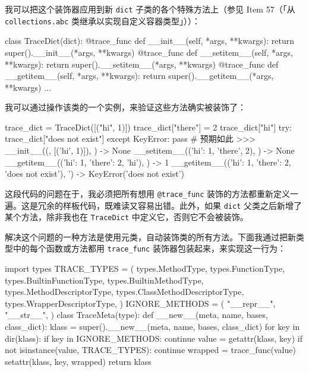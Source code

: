 我可以把这个装饰器应用到新 \texttt{dict} 子类的各个特殊方法上（参见 Item 57（「从 \texttt{collections.abc} 类继承以实现自定义容器类型」））：

\begin{codebox}[python]
class TraceDict(dict):
    @trace_func
    def __init__(self, *args, **kwargs):
        return super().__init__(*args, **kwargs)
    @trace_func
    def __setitem__(self, *args, **kwargs):
        return super().__setitem__(*args, **kwargs)
    @trace_func
    def __getitem__(self, *args, **kwargs):
        return super().__getitem__(*args, **kwargs)
    ...
\end{codebox}

我可以通过操作该类的一个实例，来验证这些方法确实被装饰了：

\begin{codebox}[python]
trace_dict = TraceDict([("hi", 1)])
trace_dict["there"] = 2
trace_dict["hi"]
try:
    trace_dict["does not exist"]
except KeyError:
    pass  # 预期如此
>>>
__init__(({}, [('hi', 1)]), {}) -> None
__setitem__(({'hi': 1}, 'there', 2), {}) -> None
__getitem__(({'hi': 1, 'there': 2}, 'hi'), {}) -> 1
__getitem__(({'hi': 1, 'there': 2}, 'does not exist'),
'{}) -> KeyError('does not exist')
\end{codebox}

这段代码的问题在于，我必须把所有想用 \texttt{@trace\_func} 装饰的方法都重新定义一遍。这是冗余的样板代码，既难读又容易出错。此外，如果 \texttt{dict} 父类之后新增了某个方法，除非我也在 \texttt{TraceDict} 中定义它，否则它不会被装饰。

解决这个问题的一种方法是使用元类，自动装饰类的所有方法。下面我通过把新类型中的每个函数或方法都用 \texttt{trace\_func} 装饰器包装起来，来实现这一行为：

\begin{codebox}[python]
import types
TRACE_TYPES = (
    types.MethodType,
    types.FunctionType,
    types.BuiltinFunctionType,
    types.BuiltinMethodType,
    types.MethodDescriptorType,
    types.ClassMethodDescriptorType,
    types.WrapperDescriptorType,
)
IGNORE_METHODS = (
    "__repr__",
    "__str__",
)
class TraceMeta(type):
    def __new__(meta, name, bases, class_dict):
        klass = super().__new__(meta, name, bases, class_dict)
        for key in dir(klass):
            if key in IGNORE_METHODS:
                continue
            value = getattr(klass, key)
            if not isinstance(value, TRACE_TYPES):
                continue
            wrapped = trace_func(value)
            setattr(klass, key, wrapped)
        return klass
\end{codebox}

